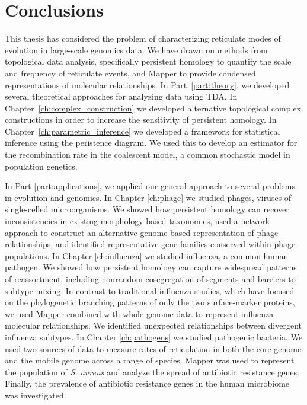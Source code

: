 
\chapter{Conclusions}
\label{ch:conclusions}

This thesis has considered the problem of characterizing reticulate modes of evolution in large-scale genomics data.
We have drawn on methods from topological data analysis, specifically persistent homology to quantify the scale and frequency of reticulate events, and Mapper to provide condensed representations of molecular relationships.
In Part~\ref{part:theory}, we developed several theoretical approaches for analyzing data using TDA. 
In Chapter~\ref{ch:complex_construction} we developed alternative topological complex constructions in order to increase the sensitivity of persistent homology.
In Chapter~\ref{ch:parametric_inference} we developed a framework for statistical inference using the peristence diagram.
We used this to develop an estimator for the recombination rate in the coalescent model, a common stochastic model in population genetics.

In Part \ref{part:applications}, we applied our general approach to several problems in evolution and genomics.
In Chapter \ref{ch:phage} we studied phages, viruses of single-celled microorganisms.
We showed how persistent homology can recover inconsistencies in existing morphology-based taxonomies, used a network approach to construct an alternative genome-based representation of phage relationships, and identified representative gene families conserved within phage populations.
In Chapter \ref{ch:influenza} we studied influenza, a common human pathogen.
We showed how persistent homology can capture widespread patterns of reassortment, including nonrandom cosegregation of segments and barriers to subtype mixing.
In contrast to traditional influenza studies, which have focused on the phylogenetic branching patterns of only the two surface-marker proteins, we used Mapper combined with whole-genome data to represent influenza molecular relationships.
We identified unexpected relationships between divergent influenza subtypes.
In Chapter \ref{ch:pathogens} we studied pathogenic bacteria.
We used two sources of data to measure rates of reticulation in both the core genome and the mobile genome across a range of species.
Mapper was used to represent the population of \emph{S. aureus} and analyze the spread of antibiotic resistance genes.
Finally, the prevalence of antibiotic resistance genes in the human microbiome was investigated.